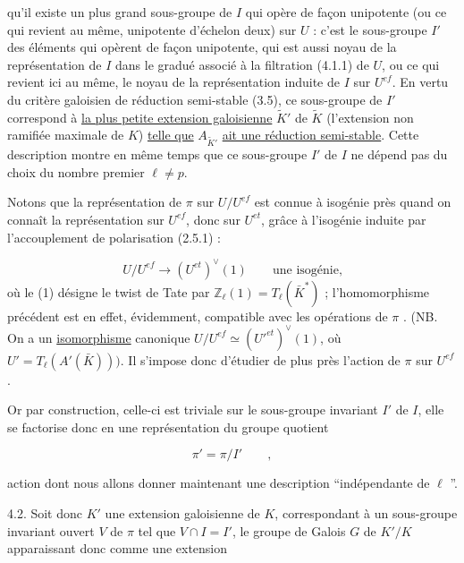 
qu'il existe un plus grand sous-groupe de $I$ qui opère de façon unipotente (ou ce qui revient au même, unipotente d'échelon deux) sur $U$ : c'est le sous-groupe $I'$ des éléments qui opèrent de façon unipotente, qui est aussi noyau de la représentation de $I$ dans le gradué associé à la filtration (4.1.1) de $U$, ou ce qui revient ici au même, le noyau de la représentation induite de $I$ sur $U^{ef}$. En vertu du critère galoisien de réduction semi-stable (3.5), ce sous-groupe de $I'$ correspond à \underline{la plus petite extension galoisienne} $\tilde{K}'$ de $\tilde{K}$ (l'extension non ramifiée maximale de $K$) \underline{telle que} $A_{\tilde{K}'}$ \underline{ait une réduction semi-stable}. Cette description montre en même temps que ce sous-groupe $I'$ de $I$ ne dépend pas du choix du nombre premier $\ell \neq p$.

Notons que la représentation de $\pi$ sur $U/U^{ef}$ est connue à isogénie près quand on connaît la représentation sur $U^{ef}$, donc sur $U^{et}$, grâce à l'isogénie induite par l'accouplement de polarisation (2.5.1) :

\begin{equation}\tag{4.1.2}
U/U^{ef} \longrightarrow (U^{et})^{\vee}(1) \qquad \mbox{une isogénie,}
\end{equation}
où le (1) désigne le twist de Tate par $\mathbb{Z}_\ell(1) = T_\ell(\bar{K}^*)$ ; l'homomorphisme précédent est en effet, évidemment, compatible avec les opérations de $\pi$ . (NB. On a un \underline{isomorphisme} canonique $U/U^{ef} \simeq ({U'}^{et})^{\vee} (1)$, où $U' = T_\ell(A'(\bar{K})))$. Il s'impose donc d'étudier de plus près l'action de $\pi$ sur $U^{ef}$.

Or par construction, celle-ci est triviale sur le sous-groupe invariant $I'$ de $I$, elle se factorise donc en une représentation du groupe quotient

\begin{equation}\tag{4.1.3}
\pi' = \pi/I' \qquad ,
\end{equation}


action dont nous allons donner maintenant une description ``indépendante de $\ell$ ''.

4.2. Soit donc $K'$ une extension galoisienne de $K$, correspondant à un sous-groupe invariant ouvert $V$ de $\pi$ tel que $V \cap I = I'$, le groupe de Galois $G$ de $K'/K$ apparaissant donc comme une extension


